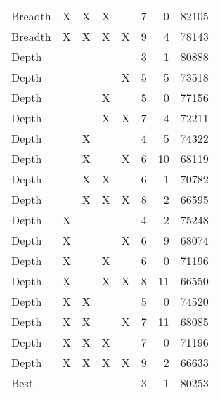 \begin{tabular}{lllllrrr}
    Breadth &         X &        X &          X &       &         7 &               0 &      82105 \\
    Breadth &         X &        X &          X &     X &         9 &               4 &      78143 \\
      Depth &           &          &            &       &         3 &               1 &      80888 \\
      Depth &           &          &            &     X &         5 &               5 &      73518 \\
      Depth &           &          &          X &       &         5 &               0 &      77156 \\
      Depth &           &          &          X &     X &         7 &               4 &      72211 \\
      Depth &           &        X &            &       &         4 &               5 &      74322 \\
      Depth &           &        X &            &     X &         6 &              10 &      68119 \\
      Depth &           &        X &          X &       &         6 &               1 &      70782 \\
      Depth &           &        X &          X &     X &         8 &               2 &      66595 \\
      Depth &         X &          &            &       &         4 &               2 &      75248 \\
      Depth &         X &          &            &     X &         6 &               9 &      68074 \\
      Depth &         X &          &          X &       &         6 &               0 &      71196 \\
      Depth &         X &          &          X &     X &         8 &              11 &      66550 \\
      Depth &         X &        X &            &       &         5 &               0 &      74520 \\
      Depth &         X &        X &            &     X &         7 &              11 &      68085 \\
      Depth &         X &        X &          X &       &         7 &               0 &      71196 \\
      Depth &         X &        X &          X &     X &         9 &               2 &      66633 \\
       Best &           &          &            &       &         3 &               1 &      80253 \\

\end{tabular}
